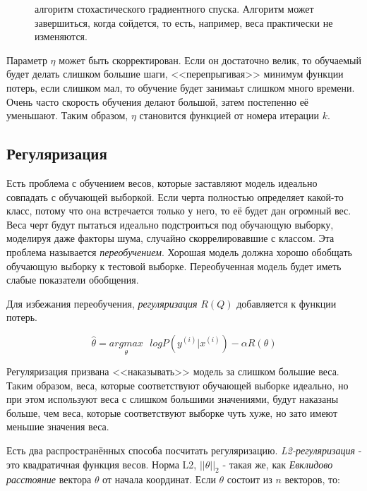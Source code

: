 \documentclass[a4paper,12pt,preview]{report} %
\begin{document}
	\begin{figure}[H]
		\caption{алгоритм стохастического градиентного спуска. Алгоритм может завершиться, когда сойдется, то есть, например, веса практически не изменяются.}
		\label{fig:gradalg}
	\end{figure}
	
	Параметр $\eta$ может быть скорректирован. Если он достаточно велик, то обучаемый будет делать слишком большие шаги, <<перепрыгивая>> минимум функции потерь, если слишком мал, то обучение будет занимаьт слишком много времени. Очень часто скорость обучения делают большой, затем постепенно её уменьшают. Таким образом, $\eta$ становится функцией от номера итерации $k$.
	
	\subsection{Регуляризация}
	
	Есть проблема с обучением весов, которые заставляют модель идеально совпадать с обучающей выборкой. Если черта полностью определяет какой-то класс, потому что она встречается только у него, то её будет дан огромный вес. Веса черт будут пытаться идеально подстроиться под обучающую выборку, моделируя даже факторы шума, случайно скоррелировавшие с классом. Эта проблема называется \textit{переобучением}. Хорошая модель должна хорошо обобщать обучающую выборку к тестовой выборке. Переобученная модель будет иметь слабые показатели обобщения.
	
	Для избежания переобучения, \textit{регуляризация} $R(Q)$ добавляется к функции потерь.
	
	\begin{equation}
	\hat{\theta} = \underset{\theta}{argmax} \text{ } logP(y^{(i)} | x^{(i)}) - \alpha R(\theta)
	\end{equation}
	
	Регуляризация призвана <<наказывать>> модель за слишком большие веса. Таким образом, веса, которые соответствуют обучающей выборке идеально, но при этом используют веса с слишком большими значениями, будут наказаны больше, чем веса, которые соответствуют выборке чуть хуже, но зато имеют меньшие значения веса. 
	
	Есть два распространённых способа посчитать регуляризацию. \textit{L2-регуляризация} - это квадратичная функция весов. Норма L2, $||\theta||_2$ - такая же, как \textit{Евклидово расстояние} вектора $\theta$ от начала координат. Если $\theta$ состоит из $n$ векторов, то:
	
\end{document}
